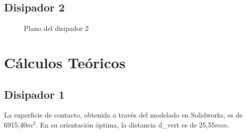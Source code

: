 \documentclass[conference]{IEEEtran}
\begin{document}
\subsection{Disipador 2}
\begin{figure}[h]
    \centering
    \caption{Plano del disipador 2}
\end{figure}


\section{Cálculos Teóricos}
\subsection{Disipador 1}

La superficie de contacto, obtenida a través del modelado en Solidworks, es de 6915,40$m^2$.
En su orientación óptima, la distancia d_vert es de 25,55$mm$.
\end{document}

